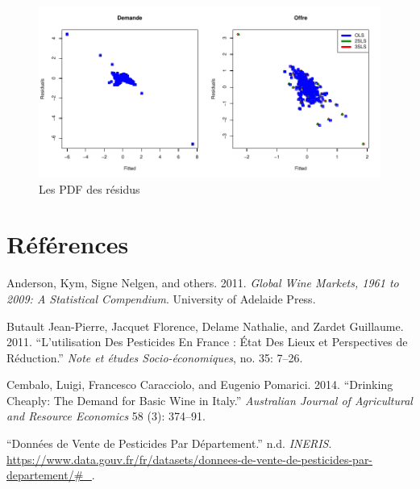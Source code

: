 \documentclass[11pt,]{article}
\begin{document}
\FloatBarrier

\FloatBarrier

\begin{figure}[!htbp]

{\centering \includegraphics{note2pres_files/figure-latex/unnamed-chunk-102-1} 

}

\caption{Les PDF des résidus}\label{fig:unnamed-chunk-102}
\end{figure}

\FloatBarrier

\newpage

\hypertarget{references}{%
\section*{Références}\label{references}}

\hypertarget{refs}{}
\leavevmode\hypertarget{ref-anderson2011global}{}%
Anderson, Kym, Signe Nelgen, and others. 2011. \emph{Global Wine
Markets, 1961 to 2009: A Statistical Compendium}. University of Adelaide
Press.

\leavevmode\hypertarget{ref-Butault2011}{}%
Butault Jean-Pierre, Jacquet Florence, Delame Nathalie, and Zardet
Guillaume. 2011. ``L'utilisation Des Pesticides En France : État Des
Lieux et Perspectives de Réduction.'' \emph{Note et études
Socio-économiques}, no. 35: 7--26.

\leavevmode\hypertarget{ref-cembalo2014}{}%
Cembalo, Luigi, Francesco Caracciolo, and Eugenio Pomarici. 2014.
``Drinking Cheaply: The Demand for Basic Wine in Italy.''
\emph{Australian Journal of Agricultural and Resource Economics} 58 (3):
374--91.

\leavevmode\hypertarget{ref-ineris}{}%
``Données de Vente de Pesticides Par Département.'' n.d. \emph{INERIS}.
\url{https://www.data.gouv.fr/fr/datasets/donnees-de-vente-de-pesticides-par-departement/\#_}.
\end{document}
